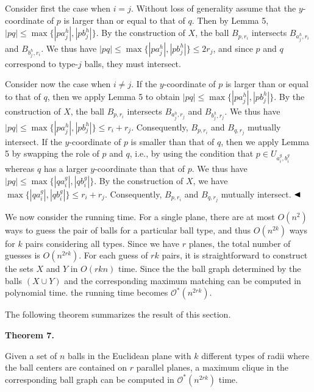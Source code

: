 \documentclass[10pt,a4paper]{amsart}
\begin{document}
\par
\par
Consider first the case when $i=j$. Without loss of generality assume that the $y$-coordinate of $p$ is larger than or equal to that of $q$. Then by Lemma 5, $|pq|\leq\max\{|pa^{h}_{j}|,|pb^{h}_{j}|\}$. By the construction of $X$, the ball $B_{p,r_{i}}$ intersects $B_{a^{h}_{j},r_{i}}$ and $B_{b^{h}_{j},r_{i}}$. We thus have $|pq|\leq\max\{|pa^{h}_{j}|,|pb^{h}_{j}|\}\leq 2r_{j}$, and since $p$ and $q$ correspond to type-$j$ balls, they must intersect.
\par
\par
Consider now the case when $i\not=j$. If the $y$-coordinate of $p$ is larger than or equal to that of $q$, then we apply Lemma 5 to obtain $|pq|\leq\max\{|pa^{h}_{j}|,|pb^{h}_{j}|\}$. By the construction of $X$, the ball $B_{p,r_{i}}$ intersects $B_{a^{h}_{j},r_{j}}$ and $B_{b^{h}_{j},r_{j}}$. We thus have $|pq|\leq\max\{|pa^{h}_{j}|,|pb^{h}_{j}|\}\leq r_{i}+r_{j}$. Consequently, $B_{p,r_{i}}$ and $B_{q,r_{j}}$ mutually intersect. If the $y$-coordinate of $p$ is smaller than that of $q$, then we apply Lemma 5 by swapping the role of $p$ and $q$, i.e., by using the condition that $p\in U_{a^{g}_{i},b^{g}_{i}}$ whereas $q$ has a larger $y$-coordinate than that of $p$. We thus have $|pq|\leq\max\{|qa^{g}_{i}|,|qb^{g}_{i}|\}$. By the construction of $X$, we have $\max\{|qa^{g}_{i}|,|qb^{g}_{i}|\}\leq r_{i}+r_{j}$. Consequently, $B_{p,r_{i}}$ and $B_{q,r_{j}}$ mutually intersect. $\hfill\blacktriangleleft$
\par
\par
We now consider the running time. For a single plane, there are at most $O(n^{2})$ ways to guess the pair of balls for a particular ball type, and thus $O(n^{2k})$ ways for $k$ pairs considering all types. Since we have $r$ planes, the total number of guesses is $O(n^{2rk})$. For each guess of $rk$ pairs, it is straightforward to construct the sets $X$ and $Y$ in $O(rkn)$ time. Since the the ball graph determined by the balls $(X\cup Y)$ and the corresponding maximum matching can be computed in polynomial time. the running time becomes $\mathcal{O}^{*}(n^{2rk})$.
\par
\par
The following theorem summarizes the result of this section.
\par
\par
\par\medskip\noindent\textbf{Theorem 7.}\par
Given a set of $n$ balls in the Euclidean plane with $k$ different types of radii where the ball centers are contained on $r$ parallel planes, a maximum clique in the corresponding ball graph can be computed in $\mathcal{O}^{*}(n^{2rk})$ time.
\end{document}
